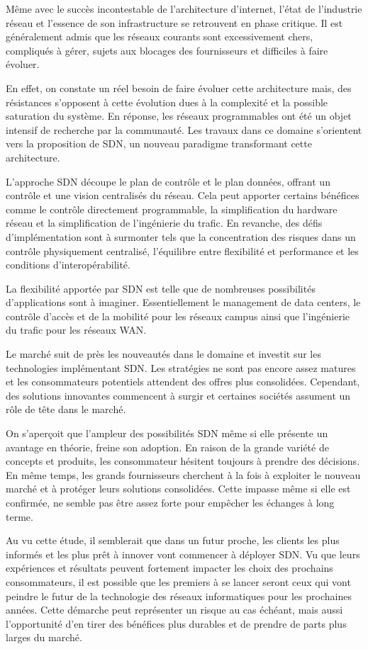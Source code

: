 
Même avec le succès incontestable de l'architecture d'internet, l'état de l'industrie réseau et l'essence de son infrastructure se retrouvent en phase critique. Il est généralement admis que les réseaux courants sont excessivement chers, compliqués à gérer, sujets aux blocages des fournisseurs et difficiles à faire évoluer. 

En effet, on constate un réel besoin de faire évoluer cette architecture mais, des résistances s'opposent à cette évolution dues à la complexité et la possible saturation du système. En réponse, les réseaux programmables ont été un objet intensif de recherche par la communauté. Les travaux dans ce domaine s'orientent vers la proposition de SDN, un nouveau paradigme transformant cette architecture.

L'approche SDN découpe le plan de contrôle et le plan données, offrant un contrôle et une vision centralisés du réseau. Cela peut apporter certains bénéfices comme le contrôle directement programmable, la simplification du hardware réseau et la simplification de l'ingénierie du trafic. En revanche, des défis d'implémentation sont à surmonter tels que la concentration des risques dans un contrôle physiquement centralisé, l'équilibre entre flexibilité et performance et les conditions d'interopérabilité.

La flexibilité apportée par SDN est telle que de nombreuses possibilités d'applications sont à imaginer. Essentiellement le management de data centers, le contrôle d'accès et de la mobilité pour les réseaux campus ainsi que  l'ingénierie du trafic pour les réseaux WAN.

Le marché suit de près les nouveautés dans le domaine et investit sur les technologies implémentant SDN. Les stratégies ne sont pas encore assez matures et les consommateurs potentiels attendent des offres plus consolidées. Cependant, des solutions innovantes commencent à surgir et certaines sociétés assument un rôle de tête dans le marché.

On s'aperçoit que l'ampleur des possibilités SDN même si elle présente un avantage en théorie, freine son adoption. En raison de la grande variété de concepts et produits, les consommateur hésitent toujours à prendre des décisions. En même temps, les grands fournisseurs cherchent à la fois à exploiter le nouveau marché et à protéger leurs solutions consolidées. Cette impasse même si elle est confirmée, ne semble pas être assez forte pour empêcher les échanges à long terme.

Au vu cette étude, il semblerait que dans un futur proche, les clients les plus informés et les plus prêt à innover vont commencer à déployer SDN. Vu que leurs expériences et résultats peuvent fortement impacter les choix des prochains consommateurs, il est possible que les premiers à se lancer seront ceux qui vont peindre le futur de la technologie des réseaux informatiques pour les prochaines années. Cette démarche peut représenter un risque au cas échéant, mais aussi l'opportunité d'en tirer des bénéfices plus durables et de prendre de parts plus larges du marché.